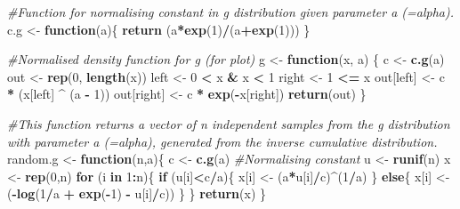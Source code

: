 \documentclass[]{article}
\newenvironment{Shaded}{\begin{snugshade}}{\end{snugshade}}
\newcommand{\CommentTok}[1]{\textcolor[rgb]{0.56,0.35,0.01}{\textit{#1}}}
\newcommand{\ControlFlowTok}[1]{\textcolor[rgb]{0.13,0.29,0.53}{\textbf{#1}}}
\newcommand{\DecValTok}[1]{\textcolor[rgb]{0.00,0.00,0.81}{#1}}
\newcommand{\KeywordTok}[1]{\textcolor[rgb]{0.13,0.29,0.53}{\textbf{#1}}}
\newcommand{\NormalTok}[1]{#1}
\newcommand{\OperatorTok}[1]{\textcolor[rgb]{0.81,0.36,0.00}{\textbf{#1}}}
\newcommand{\StringTok}[1]{\textcolor[rgb]{0.31,0.60,0.02}{#1}}
\begin{document}
\begin{Shaded}
\begin{Highlighting}[]
\CommentTok{#Function for normalising constant in g distribution given parameter a (=alpha).}
\NormalTok{c.g <-}\StringTok{ }\ControlFlowTok{function}\NormalTok{(a)\{}
  \KeywordTok{return}\NormalTok{ (a}\OperatorTok{*}\KeywordTok{exp}\NormalTok{(}\DecValTok{1}\NormalTok{)}\OperatorTok{/}\NormalTok{(a}\OperatorTok{+}\KeywordTok{exp}\NormalTok{(}\DecValTok{1}\NormalTok{)))}
\NormalTok{\}}

\CommentTok{#Normalised density function for g (for plot)}
\NormalTok{g <-}\StringTok{ }\ControlFlowTok{function}\NormalTok{(x, a) \{}
\NormalTok{  c <-}\StringTok{ }\KeywordTok{c.g}\NormalTok{(a)}
\NormalTok{  out <-}\StringTok{ }\KeywordTok{rep}\NormalTok{(}\DecValTok{0}\NormalTok{, }\KeywordTok{length}\NormalTok{(x))}
\NormalTok{  left <-}\StringTok{ }\DecValTok{0} \OperatorTok{<}\StringTok{ }\NormalTok{x }\OperatorTok{&}\StringTok{ }\NormalTok{x }\OperatorTok{<}\StringTok{ }\DecValTok{1}
\NormalTok{  right <-}\StringTok{ }\DecValTok{1} \OperatorTok{<=}\StringTok{ }\NormalTok{x}
\NormalTok{  out[left] <-}\StringTok{ }\NormalTok{c }\OperatorTok{*}\StringTok{ }\NormalTok{(x[left] }\OperatorTok{^}\StringTok{ }\NormalTok{(a }\OperatorTok{-}\StringTok{ }\DecValTok{1}\NormalTok{))}
\NormalTok{  out[right] <-}\StringTok{ }\NormalTok{c }\OperatorTok{*}\StringTok{ }\KeywordTok{exp}\NormalTok{(}\OperatorTok{-}\NormalTok{x[right])}
\KeywordTok{return}\NormalTok{(out)}
\NormalTok{\}}

\CommentTok{#This function returns a vector of n independent samples from the g distribution with parameter a (=alpha), generated from the inverse cumulative distribution. }
\NormalTok{random.g <-}\StringTok{ }\ControlFlowTok{function}\NormalTok{(n,a)\{}
\NormalTok{  c <-}\StringTok{ }\KeywordTok{c.g}\NormalTok{(a) }\CommentTok{#Normalising constant}
\NormalTok{  u <-}\StringTok{ }\KeywordTok{runif}\NormalTok{(n)}
\NormalTok{  x <-}\StringTok{ }\KeywordTok{rep}\NormalTok{(}\DecValTok{0}\NormalTok{,n)}
  \ControlFlowTok{for}\NormalTok{ (i }\ControlFlowTok{in} \DecValTok{1}\OperatorTok{:}\NormalTok{n)\{}
    \ControlFlowTok{if}\NormalTok{ (u[i]}\OperatorTok{<}\NormalTok{c}\OperatorTok{/}\NormalTok{a)\{}
\NormalTok{      x[i] <-}\StringTok{ }\NormalTok{(a}\OperatorTok{*}\NormalTok{u[i]}\OperatorTok{/}\NormalTok{c)}\OperatorTok{^}\NormalTok{(}\DecValTok{1}\OperatorTok{/}\NormalTok{a)}
\NormalTok{    \}}
    \ControlFlowTok{else}\NormalTok{\{}
\NormalTok{      x[i] <-}\StringTok{ }\NormalTok{(}\OperatorTok{-}\KeywordTok{log}\NormalTok{(}\DecValTok{1}\OperatorTok{/}\NormalTok{a }\OperatorTok{+}\StringTok{ }\KeywordTok{exp}\NormalTok{(}\OperatorTok{-}\DecValTok{1}\NormalTok{) }\OperatorTok{-}\StringTok{ }\NormalTok{u[i]}\OperatorTok{/}\NormalTok{c))}
\NormalTok{    \}}
\NormalTok{  \}}
  \KeywordTok{return}\NormalTok{(x)}
\NormalTok{\}}
\end{Highlighting}
\end{Shaded}
\end{document}
